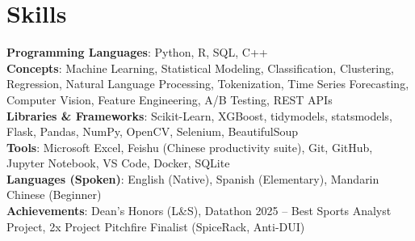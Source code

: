 \section{Skills}
 \begin{itemize}[leftmargin=0.15in, label={}]
    \small{\item{
     \textbf{Programming Languages}{: Python, R, SQL, C++} \\
     \textbf{Concepts}{: Machine Learning, Statistical Modeling, Classification, Clustering, Regression, Natural Language Processing, Tokenization, Time Series Forecasting, Computer Vision, Feature Engineering, A/B Testing, REST APIs} \\
     \textbf{Libraries \& Frameworks}{: Scikit-Learn, XGBoost, tidymodels, statsmodels, Flask, Pandas, NumPy, OpenCV, Selenium, BeautifulSoup} \\
     \textbf{Tools}{: Microsoft Excel, Feishu (Chinese productivity suite), Git, GitHub, Jupyter Notebook, VS Code, Docker, SQLite}\\
     \textbf{Languages (Spoken)}{: English (Native), Spanish (Elementary), Mandarin Chinese (Beginner)} \\
     \textbf{Achievements}{: Dean's Honors (L\&S), Datathon 2025 -- Best Sports Analyst Project, 2x Project Pitchfire Finalist (SpiceRack, Anti-DUI)}    }}
 \end{itemize}
 

 